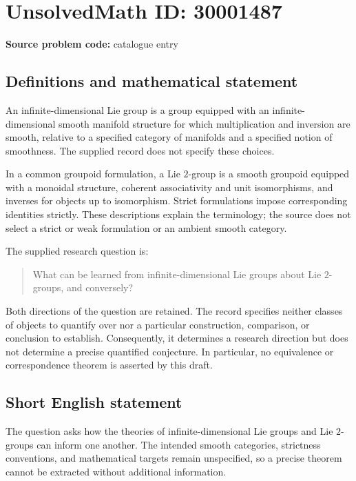 \documentclass[11pt]{article}
\begin{document}
\section*{UnsolvedMath ID: 30001487}
\textbf{Source problem code:} catalogue entry
\subsection{Definitions and mathematical statement}
An infinite-dimensional Lie group is a group equipped with an infinite-dimensional smooth manifold structure for which multiplication and inversion are smooth, relative to a specified category of manifolds and a specified notion of smoothness. The supplied record does not specify these choices.

In a common groupoid formulation, a Lie \(2\)-group is a smooth groupoid equipped with a monoidal structure, coherent associativity and unit isomorphisms, and inverses for objects up to isomorphism. Strict formulations impose corresponding identities strictly. These descriptions explain the terminology; the source does not select a strict or weak formulation or an ambient smooth category.

The supplied research question is:
\begin{quote}
What can be learned from infinite-dimensional Lie groups about Lie \(2\)-groups, and conversely?
\end{quote}
Both directions of the question are retained. The record specifies neither classes of objects to quantify over nor a particular construction, comparison, or conclusion to establish. Consequently, it determines a research direction but does not determine a precise quantified conjecture. In particular, no equivalence or correspondence theorem is asserted by this draft.
\subsection{Short English statement}
The question asks how the theories of infinite-dimensional Lie groups and Lie \(2\)-groups can inform one another. The intended smooth categories, strictness conventions, and mathematical targets remain unspecified, so a precise theorem cannot be extracted without additional information.
\end{document}
